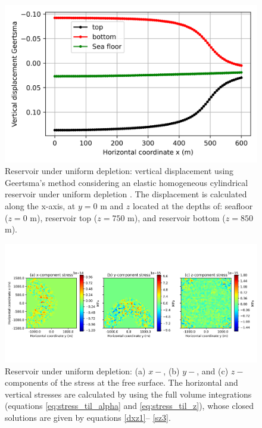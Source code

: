 \documentclass[P]{BrJG_submit}
\begin{document}
\begin{figure}[!h]
    \centering
    \includegraphics[scale=0.40]{figures/Figure_Displacement_z_levels_Geertsma.png}
    \caption{Reservoir under uniform depletion: vertical displacement using Geertsma’s method 
    \citep{Geertsma73}  
	considering an elastic homogeneous cylindrical reservoir under uniform depletion \citep{Fjaer08}.
	The displacement is calculated along the x-axis, at $y = 0$ m and $z$ located at the depths of:  seafloor 
	($z = 0$ m), reservoir top ($z = 750$ m), and reservoir bottom ($z = 850$ m).}
	\label{fig:displacement_z_levels_Geertsma}
\end{figure} 
\begin{figure}[!t]
    \centering
    \includegraphics[width=\textwidth]{figures/Figure_Null_stress.png}
    \vspace{-2cm}
    \caption{Reservoir under uniform depletion: (a) $x-$, (b) $y-$, and 
    (c) $z-$components of the stress at the free surface. 
	The horizontal and vertical stresses are calculated by using 
	the full volume integrations (equations \ref{eq:stress_til_alpha} 
	and \ref{eq:stress_til_z}),
	whose closed solutions are given by equations \ref{dxz1}--
	\ref{sz3}.}
	\label{fig:Null_stress}
\end{figure} 
\end{document}
